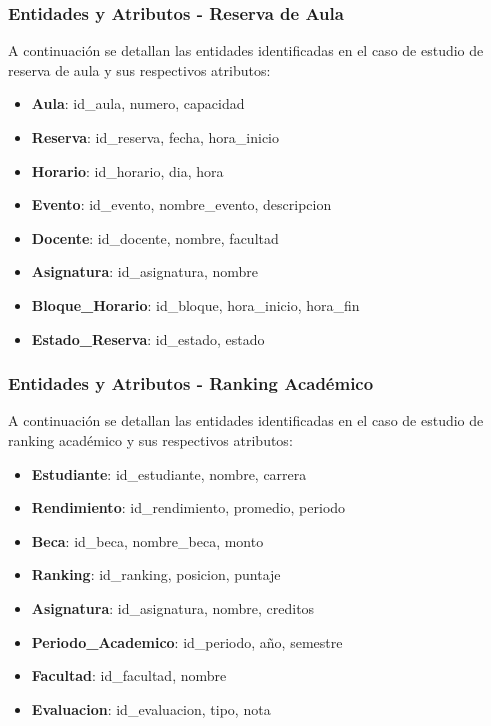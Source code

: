 \documentclass{article}
\begin{document}
\subsubsection{Entidades y Atributos - Reserva de Aula}

A continuación se detallan las entidades identificadas en el caso de estudio de reserva de aula y sus respectivos atributos:

\begin{itemize}
    \item \textbf{Aula}: id\_aula, numero, capacidad
    \item \textbf{Reserva}: id\_reserva, fecha, hora\_inicio
    \item \textbf{Horario}: id\_horario, dia, hora
    \item \textbf{Evento}: id\_evento, nombre\_evento, descripcion
    \item \textbf{Docente}: id\_docente, nombre, facultad
    \item \textbf{Asignatura}: id\_asignatura, nombre
    \item \textbf{Bloque\_Horario}: id\_bloque, hora\_inicio, hora\_fin
    \item \textbf{Estado\_Reserva}: id\_estado, estado
\end{itemize}

\subsubsection{Entidades y Atributos - Ranking Académico}

A continuación se detallan las entidades identificadas en el caso de estudio de ranking académico y sus respectivos atributos:

\begin{itemize}
    \item \textbf{Estudiante}: id\_estudiante, nombre, carrera
    \item \textbf{Rendimiento}: id\_rendimiento, promedio, periodo
    \item \textbf{Beca}: id\_beca, nombre\_beca, monto
    \item \textbf{Ranking}: id\_ranking, posicion, puntaje
    \item \textbf{Asignatura}: id\_asignatura, nombre, creditos
    \item \textbf{Periodo\_Academico}: id\_periodo, año, semestre
    \item \textbf{Facultad}: id\_facultad, nombre
    \item \textbf{Evaluacion}: id\_evaluacion, tipo, nota
\end{itemize}
\end{document}
